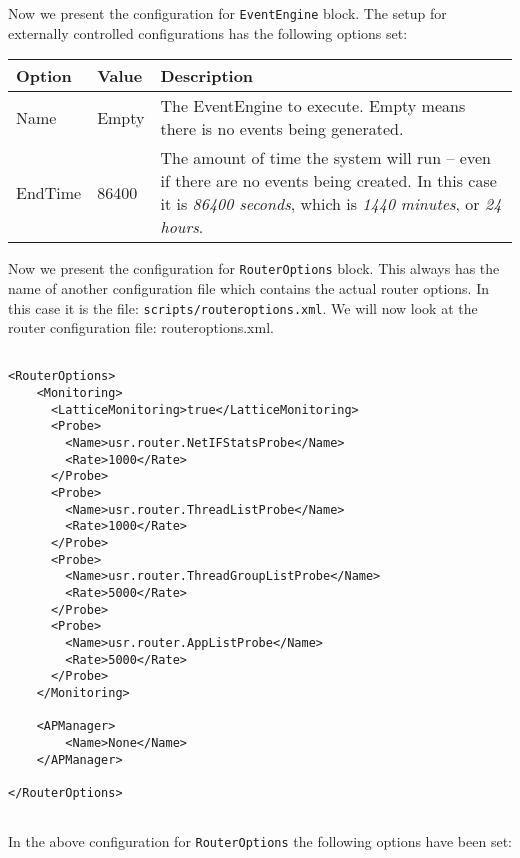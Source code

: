 \noindent Now we present the configuration for \texttt{EventEngine}
block. The setup for externally controlled configurations
has the following  options set: 

{
\small

\begin{longtable}{ | p{3.4cm} | p{3.1cm} | p{7.3cm} | }

\hline
\textbf{Option} & \textbf{Value} & \textbf{Description} \\
\hline
Name & Empty & The EventEngine to execute. Empty means there is no
events being generated. \\
\hline
EndTime & 86400 & The amount of time the system will run -- even if
there are no events being created.  In this case it is \emph{86400
  seconds}, which is \emph{1440 minutes}, or \emph{24 hours}. \\
\hline


\end{longtable}

\normalsize
}
  
\noindent Now we present the configuration for \texttt{RouterOptions}
block. This always has the name of another configuration file which
contains the actual router options. In this case it is the file:
\texttt{scripts/routeroptions.xml}.
We will now look at the router configuration file: routeroptions.xml.


\begin{lstlisting}[language=config, caption=routeroptions.xml]

<RouterOptions>
    <Monitoring>
      <LatticeMonitoring>true</LatticeMonitoring>
      <Probe>
        <Name>usr.router.NetIFStatsProbe</Name>
        <Rate>1000</Rate>
      </Probe>
      <Probe>
        <Name>usr.router.ThreadListProbe</Name>
        <Rate>1000</Rate>
      </Probe>
      <Probe>
        <Name>usr.router.ThreadGroupListProbe</Name>
        <Rate>5000</Rate>
      </Probe>
      <Probe>
        <Name>usr.router.AppListProbe</Name>
        <Rate>5000</Rate>
      </Probe>
    </Monitoring>

    <APManager>
        <Name>None</Name>
    </APManager> 

</RouterOptions>


\end{lstlisting}

\noindent  In the above configuration for \texttt{RouterOptions}
the following options have been set:

